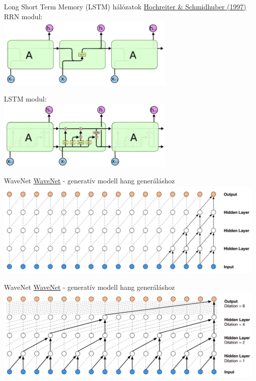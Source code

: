\begin{frame}{Long Short Term Memory (LSTM) hálózatok}
    \href{http://www.bioinf.jku.at/publications/older/2604.pdf}{Hochreiter \& Schmidhuber (1997)} \\
    
    RRN modul:\\
    \centering
    \includegraphics[width=0.65\textwidth]{figures/lstm_only_rnn.png}
    
    \raggedright LSTM modul: \\
    \centering
    \includegraphics[width=0.65\textwidth]{figures/lstm_module.png}
\end{frame}

\begin{frame}{WaveNet}
    \href{https://deepmind.com/blog/article/wavenet-generative-model-raw-audio}{WaveNet} - generatív modell hang generáláshoz
    \centering
    \includegraphics[width=1.0\textwidth]{figures/wavenet_casual_cnn.png}
\end{frame}

\begin{frame}{WaveNet}
    \href{https://deepmind.com/blog/article/wavenet-generative-model-raw-audio}{WaveNet} - generatív modell hang generáláshoz
    \centering
    \includegraphics[width=1.0\textwidth]{figures/wavenet_dilated_cnn.png}
\end{frame}

